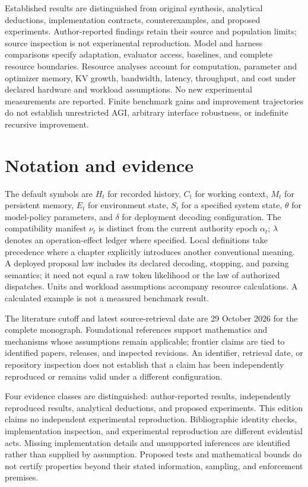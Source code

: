 Established results are distinguished from original synthesis, analytical deductions, implementation contracts, counterexamples, and proposed experiments. Author-reported findings retain their source and population limits; source inspection is not experimental reproduction. Model and harness comparisons specify adaptation, evaluator access, baselines, and complete resource boundaries. Resource analyses account for computation, parameter and optimizer memory, KV growth, bandwidth, latency, throughput, and cost under declared hardware and workload assumptions. No new experimental measurements are reported. Finite benchmark gains and improvement trajectories do not establish unrestricted AGI, arbitrary interface robustness, or indefinite recursive improvement.

\chapter*{Notation and evidence}
The default symbols are $H_t$ for recorded history, $C_t$ for working context, $M_t$ for persistent memory, $E_t$ for environment state, $S_t$ for a specified system state, $\theta$ for model-policy parameters, and $\delta$ for deployment decoding configuration. The compatibility manifest $\nu_t$ is distinct from the current authority epoch $\alpha_t$; $\lambda$ denotes an operation-effect ledger where specified. Local definitions take precedence where a chapter explicitly introduces another conventional meaning. A deployed proposal law includes its declared decoding, stopping, and parsing semantics; it need not equal a raw token likelihood or the law of authorized dispatches. Units and workload assumptions accompany resource calculations. A calculated example is not a measured benchmark result.

The literature cutoff and latest source-retrieval date are 29 October 2026 for the complete monograph. Foundational references support mathematics and mechanisms whose assumptions remain applicable; frontier claims are tied to identified papers, releases, and inspected revisions. An identifier, retrieval date, or repository inspection does not establish that a claim has been independently reproduced or remains valid under a different configuration.

Four evidence classes are distinguished: author-reported results, independently reproduced results, analytical deductions, and proposed experiments. This edition claims no independent experimental reproduction. Bibliographic identity checks, implementation inspection, and experimental reproduction are different evidential acts. Missing implementation details and unsupported inferences are identified rather than supplied by assumption. Proposed tests and mathematical bounds do not certify properties beyond their stated information, sampling, and enforcement premises.

